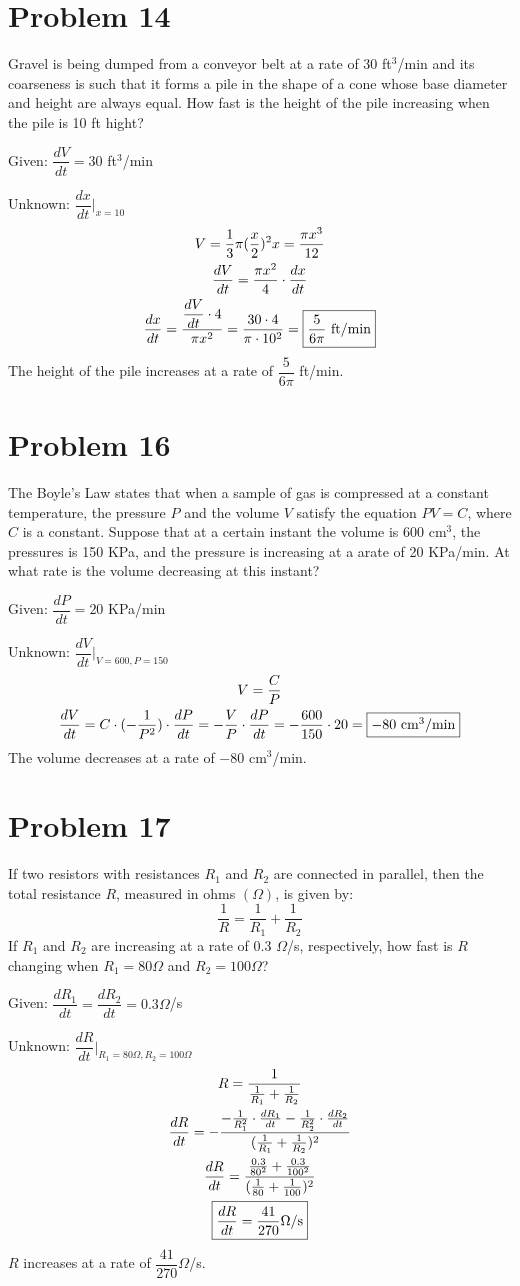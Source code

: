 \documentclass[12pt]{article}
\newcommand{\dxdt}{\dfrac{dx}{dt}}
\newcommand{\vem}{\vspace{0.5em}}
\newcommand{\problem}[1]{\section{Problem #1}}
\begin{document}
\problem{14}
Gravel is being dumped from a conveyor belt at a rate of 30 ft$^3$/min and its coarseness is such that it forms a pile in the shape of a cone whose base diameter and height are always equal. How fast is the height of the pile increasing when the pile is 10 ft hight? \vem

Given: $\dfrac{dV}{dt}=30$ ft$^3$/min\vem

Unknown: $\dfrac{dx}{dt} \Big|_{x=10}$
\begin{gather*}
    V=\frac{1}{3}\pi(\frac{x}{2})^2x=\frac{\pi x^3}{12}\\
    \frac{dV}{dt}=\frac{\pi x^2}{4}\cdot \dxdt\\
    \dxdt=\frac{\dfrac{dV}{dt}\cdot4}{\pi x^2}=\frac{30\cdot 4}{\pi \cdot 10^2}=\boxed{\frac{5}{6\pi}$ ft/min$}
\end{gather*}
The height of the pile increases at a rate of $\dfrac{5}{6\pi}$ ft/min.

\problem{16}
The Boyle's Law states that when a sample of gas is compressed at a constant temperature, the pressure $P$ and the volume $V$ satisfy the equation $PV=C$, where $C$ is a constant. Suppose that at a certain instant the volume is 600 cm$^3$, the pressures is 150 KPa, and the pressure is increasing at a arate of 20 KPa/min. At what rate is the volume decreasing at this instant? \vem

Given: $\dfrac{dP}{dt}=20$ KPa/min \vem

Unknown: $\dfrac{dV}{dt}\Big|_{V=600, P=150}$
\begin{gather*}
    V=\frac{C}{P}\\
    \frac{dV}{dt}=C\cdot (-\frac{1}{P^2})\cdot \frac{dP}{dt}=-\frac{V}{P}\cdot \frac{dP}{dt}=-\frac{600}{150}\cdot 20=\boxed{-80 $ cm$^3$/min$}
\end{gather*}
The volume decreases at a rate of $-80$ cm$^3$/min.

\problem{17}
If two resistors with resistances $R_1$ and $R_2$ are connected in parallel, then the total resistance $R$, measured
in ohms $(\Omega)$, is given by:
\[
\frac{1}{R}=\frac{1}{R_1}+\frac{1}{R_2}
\]
If $R_1$ and $R_2$ are increasing at a rate of 0.3 $\Omega$/s, respectively, how fast is $R$ changing when $R_1 = 80\Omega$
and $R_2 = 100\Omega$? \vem

Given: $\dfrac{dR_1}{dt}=\dfrac{dR_2}{dt}=0.3 \Omega$/s\vem

Unknown: $\dfrac{dR}{dt}\Big|_{R_1 = 80\Omega, R_2 = 100\Omega}$
\begin{gather*}
    R=\frac{1}{\frac{1}{R_1}+\frac{1}{R_2}}\\
    \frac{dR}{dt}=-\frac{-\frac{1}{R_1^2}\cdot\frac{dR_1}{dt}-\frac{1}{R_2^2}\cdot \frac{dR_2}{dt}}{(\frac{1}{R_1}+\frac{1}{R_2})^2}\\
    \frac{dR}{dt}=\frac{\frac{0.3}{80^2}+\frac{0.3}{100^2}}{(\frac{1}{80}+\frac{1}{100})^2}\\
    \boxed{\frac{dR}{dt}=\frac{41}{270}\Omega$/s$}
\end{gather*}
$R$ increases at a rate of $\dfrac{41}{270}\Omega$/s.
\end{document}

